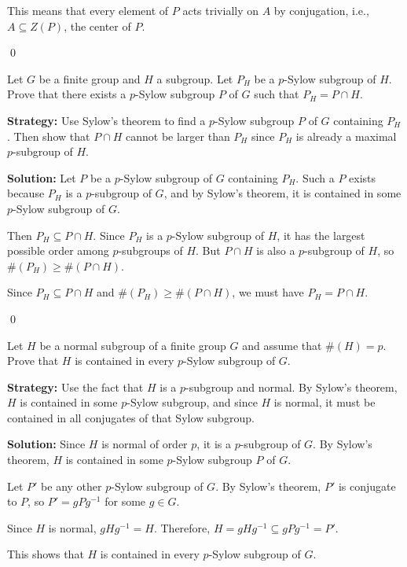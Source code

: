 This means that every element of $P$ acts trivially on $A$ by conjugation, i.e., $A \subseteq Z(P)$, the center of $P$.


\qed
\begin{problembox}
Let $G$ be a finite group and $H$ a subgroup. Let $P_H$ be a $p$-Sylow subgroup of $H$. Prove that there exists a $p$-Sylow subgroup $P$ of $G$ such that $P_H = P \cap H$.
\end{problembox}

\noindent\textbf{Strategy:} Use Sylow's theorem to find a $p$-Sylow subgroup $P$ of $G$ containing $P_H$. Then show that $P \cap H$ cannot be larger than $P_H$ since $P_H$ is already a maximal $p$-subgroup of $H$.

\noindent\textbf{Solution:} Let $P$ be a $p$-Sylow subgroup of $G$ containing $P_H$. Such a $P$ exists because $P_H$ is a $p$-subgroup of $G$, and by Sylow's theorem, it is contained in some $p$-Sylow subgroup of $G$.

Then $P_H \subseteq P \cap H$. Since $P_H$ is a $p$-Sylow subgroup of $H$, it has the largest possible order among $p$-subgroups of $H$. But $P \cap H$ is also a $p$-subgroup of $H$, so $\#(P_H) \geq \#(P \cap H)$.

Since $P_H \subseteq P \cap H$ and $\#(P_H) \geq \#(P \cap H)$, we must have $P_H = P \cap H$.


\qed
\begin{problembox}
Let $H$ be a normal subgroup of a finite group $G$ and assume that $\#(H) = p$. Prove that $H$ is contained in every $p$-Sylow subgroup of $G$.
\end{problembox}

\noindent\textbf{Strategy:} Use the fact that $H$ is a $p$-subgroup and normal. By Sylow's theorem, $H$ is contained in some $p$-Sylow subgroup, and since $H$ is normal, it must be contained in all conjugates of that Sylow subgroup.

\noindent\textbf{Solution:} Since $H$ is normal of order $p$, it is a $p$-subgroup of $G$. By Sylow's theorem, $H$ is contained in some $p$-Sylow subgroup $P$ of $G$.

Let $P'$ be any other $p$-Sylow subgroup of $G$. By Sylow's theorem, $P'$ is conjugate to $P$, so $P' = gPg^{-1}$ for some $g \in G$.

Since $H$ is normal, $gHg^{-1} = H$. Therefore, $H = gHg^{-1} \subseteq gPg^{-1} = P'$.

This shows that $H$ is contained in every $p$-Sylow subgroup of $G$.


